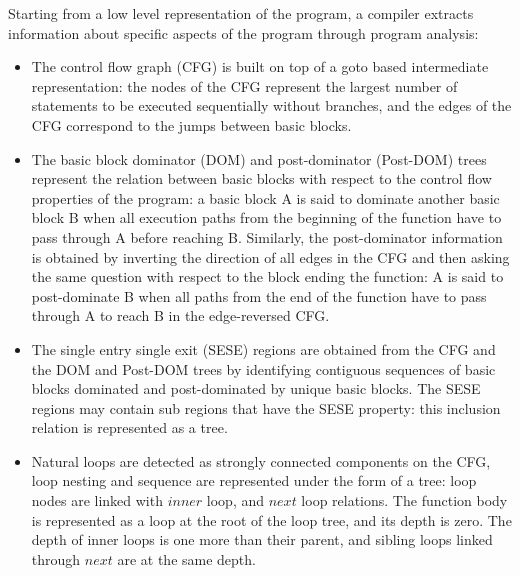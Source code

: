 \documentclass{sigplanconf}
\begin{document}
Starting from a low level representation of the program, a compiler extracts
information about specific aspects of the program through program analysis:

\begin{itemize}
\item The control flow graph (CFG) \cite{dragonbook} is built on top of a goto
  based intermediate representation: the nodes of the CFG represent the largest
  number of statements to be executed sequentially without branches, and the
  edges of the CFG correspond to the jumps between basic blocks.

\item The basic block dominator (DOM) and post-dominator (Post-DOM) trees
  \cite{dragonbook} represent the relation between basic blocks with respect to
  the control flow properties of the program: a basic block A is said to
  dominate another basic block B when all execution paths from the beginning of
  the function have to pass through A before reaching B.  Similarly, the
  post-dominator information is obtained by inverting the direction of all edges
  in the CFG and then asking the same question with respect to the block ending
  the function: A is said to post-dominate B when all paths from the end of the
  function have to pass through A to reach B in the edge-reversed CFG.

\item The single entry single exit (SESE) regions \cite{sese} are
  obtained from the CFG and the DOM and Post-DOM trees by identifying contiguous
  sequences of basic blocks dominated and post-dominated by unique basic blocks.
  The SESE regions may contain sub regions that have the SESE property: this
  inclusion relation is represented as a tree.

\item Natural loops \cite{dragonbook} are detected as strongly connected
\label{subsec:loop-tree}
  components \cite{tarjan} on the CFG, loop nesting and sequence are represented
  under the form of a tree: loop nodes are linked with $inner$ loop, and $next$
  loop relations.  The function body is represented as a loop at the root of the
  loop tree, and its depth is zero.  The depth of inner loops is one more than
  their parent, and sibling loops linked through $next$ are at the same depth.



\end{itemize}
\end{document}
